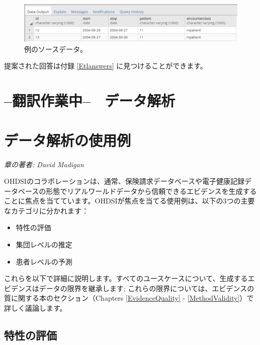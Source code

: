 \documentclass[
  11pt]{book}
\providecommand{\tightlist}{%
  \setlength{\itemsep}{0pt}\setlength{\parskip}{0pt}}
\theoremstyle{definition}
\theoremstyle{definition}
\theoremstyle{definition}
\theoremstyle{definition}
\theoremstyle{remark}
\begin{document}
\begin{figure}

{\centering \includegraphics[width=1\linewidth]{images/ExtractTransformLoad/exerciseSourceData} 

}

\caption{例のソースデータ。}\label{fig:exerciseSourceData}
\end{figure}

提案された回答は付録 \ref{Etlanswers} に見つけることができます。

\chapter*{--翻訳作業中--　データ解析}\label{ux7ffbux8a33ux4f5cux696dux4e2d-ux30c7ux30fcux30bfux89e3ux6790}

\chapter{データ解析の使用例}\label{DataAnalyticsUseCases}

\emph{章の著者: David Madigan}

OHDSIのコラボレーションは、通常、保険請求データベースや電子健康記録データベースの形態でリアルワールドデータから信頼できるエビデンスを生成することに焦点を当てています。OHDSIが焦点を当てる使用例は、以下の3つの主要なカテゴリに分かれます：

\begin{itemize}
\tightlist
\item
  特性の評価
\item
  集団レベルの推定
\item
  患者レベルの予測
\end{itemize}

これらを以下で詳細に説明します。すべてのユースケースについて、生成するエビデンスはデータの限界を継承します; これらの限界については、エビデンスの質に関する本のセクション（Chapters \ref{EvidenceQuality} - \ref{MethodValidity}）で詳しく議論します。

\section{特性の評価}\label{ux7279ux6027ux306eux8a55ux4fa1}
\end{document}
